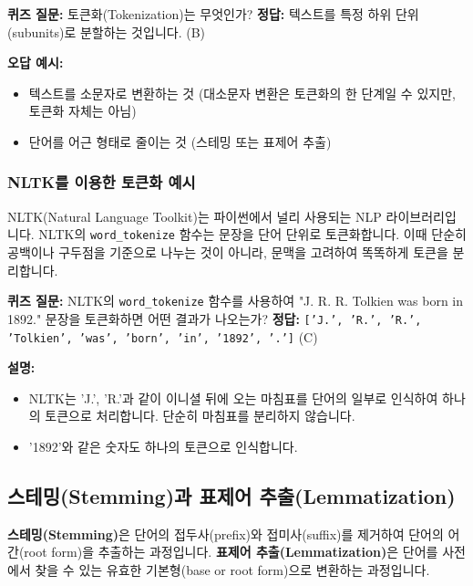 \documentclass[11pt,a4paper]{article}
\theoremstyle{definition}
\begin{document}
\begin{tcolorbox}[examplebox, title=\textbf{예시}]
\textbf{퀴즈 질문:} 토큰화(Tokenization)는 무엇인가?
\textbf{정답:} 텍스트를 특정 하위 단위(subunits)로 분할하는 것입니다. (B)

\textbf{오답 예시:}
\begin{itemize}
    \item 텍스트를 소문자로 변환하는 것 (대소문자 변환은 토큰화의 한 단계일 수 있지만, 토큰화 자체는 아님)
    \item 단어를 어근 형태로 줄이는 것 (스테밍 또는 표제어 추출)
\end{itemize}
\end{tcolorbox}

\subsubsection{NLTK를 이용한 토큰화 예시}

NLTK(Natural Language Toolkit)는 파이썬에서 널리 사용되는 NLP 라이브러리입니다. NLTK의 \texttt{word\_tokenize} 함수는 문장을 단어 단위로 토큰화합니다. 이때 단순히 공백이나 구두점을 기준으로 나누는 것이 아니라, 문맥을 고려하여 똑똑하게 토큰을 분리합니다.

\begin{tcolorbox}[examplebox, title=\textbf{예시}]
\textbf{퀴즈 질문:} NLTK의 \texttt{word\_tokenize} 함수를 사용하여 "J. R. R. Tolkien was born in 1892." 문장을 토큰화하면 어떤 결과가 나오는가?
\textbf{정답:} \texttt{['J.', 'R.', 'R.', 'Tolkien', 'was', 'born', 'in', '1892', '.']} (C)

\textbf{설명:}
\begin{itemize}
    \item NLTK는 'J.', 'R.'과 같이 이니셜 뒤에 오는 마침표를 단어의 일부로 인식하여 하나의 토큰으로 처리합니다. 단순히 마침표를 분리하지 않습니다.
    \item '1892'와 같은 숫자도 하나의 토큰으로 인식합니다.
\end{itemize}
\end{tcolorbox}

\subsection{스테밍(Stemming)과 표제어 추출(Lemmatization)}

\begin{tcolorbox}[conceptbox, title=\textbf{핵심 개념}]
\textbf{스테밍(Stemming)}은 단어의 접두사(prefix)와 접미사(suffix)를 제거하여 단어의 어간(root form)을 추출하는 과정입니다. \textbf{표제어 추출(Lemmatization)}은 단어를 사전에서 찾을 수 있는 유효한 기본형(base or root form)으로 변환하는 과정입니다.
\end{tcolorbox}
\end{document}
